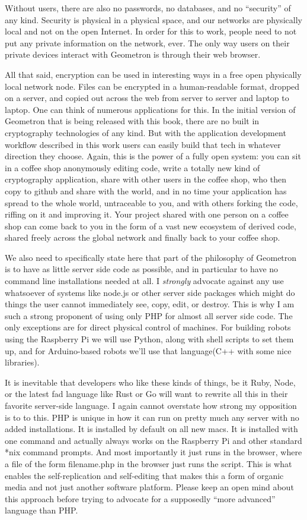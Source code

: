 Without users, there are also no passwords, no databases, and no ``security'' of any kind.  Security is physical in a physical space, and our networks are physically local and not on the open Internet.  In order for this to work, people need to not put any private information on the network, ever.  The only way users on their private devices interact with Geometron is through their web browser.  

All that said, encryption can be used in interesting ways in a free open physically local network node.  Files can be encrypted in a human-readable format, dropped on a server, and copied out across the web from server to server and laptop to laptop.  One can think of numerous applications for this.  In the initial version of Geometron that is being released with this book, there are no built in cryptography technologies of any kind.  But with the application development workflow described in this work users can easily build that tech in whatever direction they choose. Again, this is the power of a fully open system: you can sit in a coffee shop anonymously editing code, write a totally new kind of cryptography application, share with other users in the coffee shop, who then copy to github and share with the world, and in no time your application has spread to the whole world, untraceable to you, and with others forking the code, riffing on it and improving it.  Your project shared with one person on a coffee shop can come back to you in the form of a vast new ecosystem of derived code, shared freely across the global network and finally back to your coffee shop.  

We also need to specifically state here that part of the philosophy of Geometron is to have as little server side code as possible, and in particular to have no command line installations needed at all.  I \emph{strongly} advocate against any use whatsoever of systems like node.js or other server side packages which might do things the user cannot immediately see, copy, edit, or destroy.  This is why I am such a strong proponent of using only PHP for almost all server side code.  The only exceptions are for direct physical control of machines.  For building robots using the Raspberry Pi we will use Python, along with shell scripts to set them up, and for Arduino-based robots we'll use that language(C++ with some nice libraries).

It is inevitable that developers who like these kinds of things, be it Ruby, Node, or the latest fad language like Rust or Go will want to rewrite all this in their favorite server-side language.  I again cannot overstate how strong my opposition is to to this.  PHP is unique in how it can run on pretty much any server with no added installations.  It is installed by default on all new macs.  It is installed with one command and actually always works on the Raspberry Pi and other standard *nix command prompts.  And most importantly it just runs in the browser, where a file of the form filename.php in the browser just runs the script. This is what enables the self-replication and self-editing that makes this a form of organic media and not just another software platform.  Please keep an open mind about this approach before trying to advocate for a supposedly ``more advanced'' language than PHP.  

